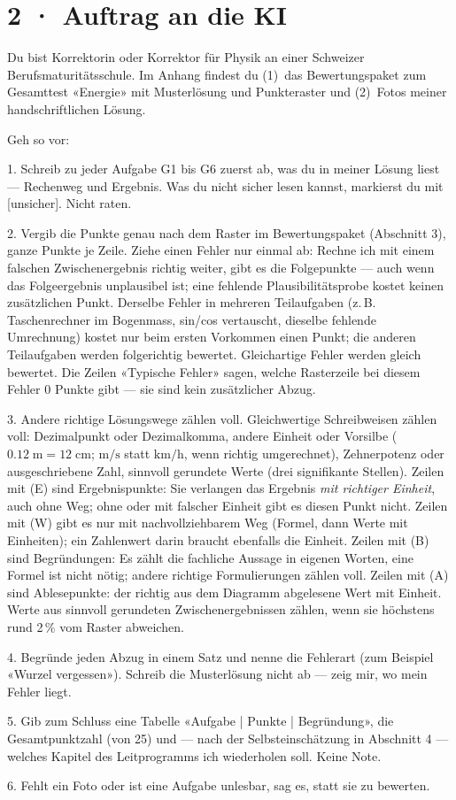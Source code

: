 \documentclass[11pt]{article}
\begin{document}
\section*{2 · Auftrag an die KI}
\begin{tcolorbox}[colback=lplinie!25,colframe=lplinie,boxrule=0.5pt,arc=1mm,fontupper=\small]
Du bist Korrektorin oder Korrektor für Physik an einer Schweizer Berufsmaturitätsschule. Im Anhang findest du (1)~das Bewertungspaket zum Gesamttest «Energie» mit Musterlösung und Punkteraster und (2)~Fotos meiner handschriftlichen Lösung.\par\medskip
Geh so vor:\par
1. Schreib zu jeder Aufgabe G1 bis G6 zuerst ab, was du in meiner Lösung liest — Rechenweg und Ergebnis. Was du nicht sicher lesen kannst, markierst du mit [unsicher]. Nicht raten.\par
2. Vergib die Punkte genau nach dem Raster im Bewertungspaket (Abschnitt 3), ganze Punkte je Zeile. Ziehe einen Fehler nur einmal ab: Rechne ich mit einem falschen Zwischenergebnis richtig weiter, gibt es die Folgepunkte — auch wenn das Folgeergebnis unplausibel ist; eine fehlende Plausibilitätsprobe kostet keinen zusätzlichen Punkt. Derselbe Fehler in mehreren Teilaufgaben (z.\,B. Taschenrechner im Bogenmass, sin/cos vertauscht, dieselbe fehlende Umrechnung) kostet nur beim ersten Vorkommen einen Punkt; die anderen Teilaufgaben werden folgerichtig bewertet. Gleichartige Fehler werden gleich bewertet. Die Zeilen «Typische Fehler» sagen, welche Rasterzeile bei diesem Fehler 0 Punkte gibt — sie sind kein zusätzlicher Abzug.\par
3. Andere richtige Lösungswege zählen voll. Gleichwertige Schreibweisen zählen voll: Dezimalpunkt oder Dezimalkomma, andere Einheit oder Vorsilbe ($0.12\;\text{m} = 12\;\text{cm}$; $\text{m/s}$ statt $\text{km/h}$, wenn richtig umgerechnet), Zehnerpotenz oder ausgeschriebene Zahl, sinnvoll gerundete Werte (drei signifikante Stellen). Zeilen mit (E) sind Ergebnispunkte: Sie verlangen das Ergebnis \emph{mit richtiger Einheit}, auch ohne Weg; ohne oder mit falscher Einheit gibt es diesen Punkt nicht. Zeilen mit (W) gibt es nur mit nachvollziehbarem Weg (Formel, dann Werte mit Einheiten); ein Zahlenwert darin braucht ebenfalls die Einheit. Zeilen mit (B) sind Begründungen: Es zählt die fachliche Aussage in eigenen Worten, eine Formel ist nicht nötig; andere richtige Formulierungen zählen voll. Zeilen mit (A) sind Ablesepunkte: der richtig aus dem Diagramm abgelesene Wert mit Einheit. Werte aus sinnvoll gerundeten Zwischenergebnissen zählen, wenn sie höchstens rund 2\,\% vom Raster abweichen.\par
4. Begründe jeden Abzug in einem Satz und nenne die Fehlerart (zum Beispiel «Wurzel vergessen»). Schreib die Musterlösung nicht ab — zeig mir, wo mein Fehler liegt.\par
5. Gib zum Schluss eine Tabelle «Aufgabe | Punkte | Begründung», die Gesamtpunktzahl (von 25) und — nach der Selbsteinschätzung in Abschnitt 4 — welches Kapitel des Leitprogramms ich wiederholen soll. Keine Note.\par
6. Fehlt ein Foto oder ist eine Aufgabe unlesbar, sag es, statt sie zu bewerten.
\end{tcolorbox}
\end{document}
